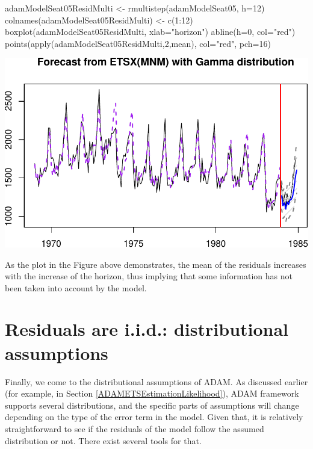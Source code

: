 \documentclass[
]{book}
\newenvironment{Shaded}{\begin{snugshade}}{\end{snugshade}}
\newcommand{\AttributeTok}[1]{\textcolor[rgb]{0.77,0.63,0.00}{#1}}
\newcommand{\DecValTok}[1]{\textcolor[rgb]{0.00,0.00,0.81}{#1}}
\newcommand{\FunctionTok}[1]{\textcolor[rgb]{0.00,0.00,0.00}{#1}}
\newcommand{\NormalTok}[1]{#1}
\newcommand{\OtherTok}[1]{\textcolor[rgb]{0.56,0.35,0.01}{#1}}
\newcommand{\SpecialCharTok}[1]{\textcolor[rgb]{0.00,0.00,0.00}{#1}}
\newcommand{\StringTok}[1]{\textcolor[rgb]{0.31,0.60,0.02}{#1}}
\theoremstyle{definition}
\theoremstyle{definition}
\theoremstyle{definition}
\theoremstyle{definition}
\theoremstyle{remark}
\begin{document}
\begin{Shaded}
\begin{Highlighting}[]
\NormalTok{adamModelSeat05ResidMulti }\OtherTok{\textless{}{-}} \FunctionTok{rmultistep}\NormalTok{(adamModelSeat05, }\AttributeTok{h=}\DecValTok{12}\NormalTok{)}
\FunctionTok{colnames}\NormalTok{(adamModelSeat05ResidMulti) }\OtherTok{\textless{}{-}} \FunctionTok{c}\NormalTok{(}\DecValTok{1}\SpecialCharTok{:}\DecValTok{12}\NormalTok{)}
\FunctionTok{boxplot}\NormalTok{(adamModelSeat05ResidMulti, }\AttributeTok{xlab=}\StringTok{"horizon"}\NormalTok{)}
\FunctionTok{abline}\NormalTok{(}\AttributeTok{h=}\DecValTok{0}\NormalTok{, }\AttributeTok{col=}\StringTok{"red"}\NormalTok{)}
\FunctionTok{points}\NormalTok{(}\FunctionTok{apply}\NormalTok{(adamModelSeat05ResidMulti,}\DecValTok{2}\NormalTok{,mean), }\AttributeTok{col=}\StringTok{"red"}\NormalTok{, }\AttributeTok{pch=}\DecValTok{16}\NormalTok{)}
\end{Highlighting}
\end{Shaded}

\includegraphics{adam_files/figure-latex/unnamed-chunk-166-1.pdf}

As the plot in the Figure above demonstrates, the mean of the residuals increases with the increase of the horizon, thus implying that some information has not been taken into account by the model.

\hypertarget{diagnosticsResidualsIIDDistribution}{%
\section{Residuals are i.i.d.: distributional assumptions}\label{diagnosticsResidualsIIDDistribution}}

Finally, we come to the distributional assumptions of ADAM. As discussed earlier (for example, in Section \ref{ADAMETSEstimationLikelihood}), ADAM framework supports several distributions, and the specific parts of assumptions will change depending on the type of the error term in the model. Given that, it is relatively straightforward to see if the residuals of the model follow the assumed distribution or not. There exist several tools for that.
\end{document}
